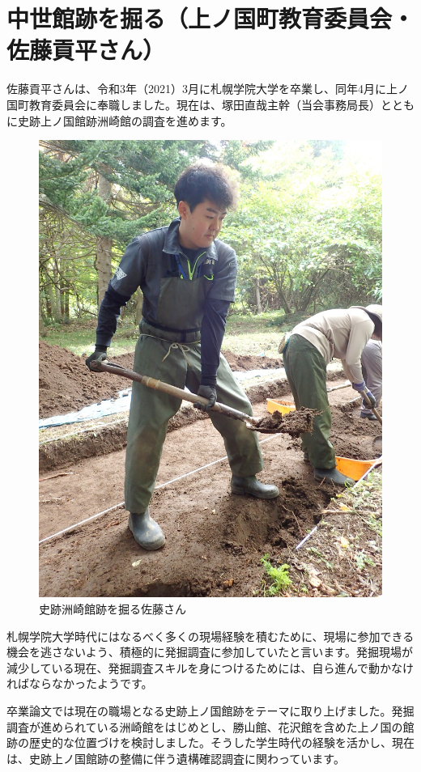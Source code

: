 \documentclass[a4j,11pt,twocolumn,openany]{jsbook}
\begin{document}
\section{中世館跡を掘る（上ノ国町教育委員会・佐藤貢平さん）}

佐藤貢平さんは、令和3年（2021）3月に札幌学院大学を卒業し、同年4月に上ノ国町教育委員会に奉職しました。現在は、塚田直哉主幹（当会事務局長）とともに史跡上ノ国館跡洲崎館の調査を進めます。

\begin{figure}[ht]
	\centering
	\includegraphics[width=0.9\linewidth]{fig/06_satou/s_satou.JPG}
	\caption{史跡洲崎館跡を掘る佐藤さん}
	\label{}
	\vspace{-\baselineskip}
\end{figure}

札幌学院大学時代にはなるべく多くの現場経験を積むために、現場に参加できる機会を逃さないよう、積極的に発掘調査に参加していたと言います。発掘現場が減少している現在、発掘調査スキルを身につけるためには、自ら進んで動かなければならなかったようです。

卒業論文では現在の職場となる史跡上ノ国館跡をテーマに取り上げました。発掘調査が進められている洲崎館をはじめとし、勝山館、花沢館を含めた上ノ国の館跡の歴史的な位置づけを検討しました。そうした学生時代の経験を活かし、現在は、史跡上ノ国館跡の整備に伴う遺構確認調査に関わっています。
\end{document}
